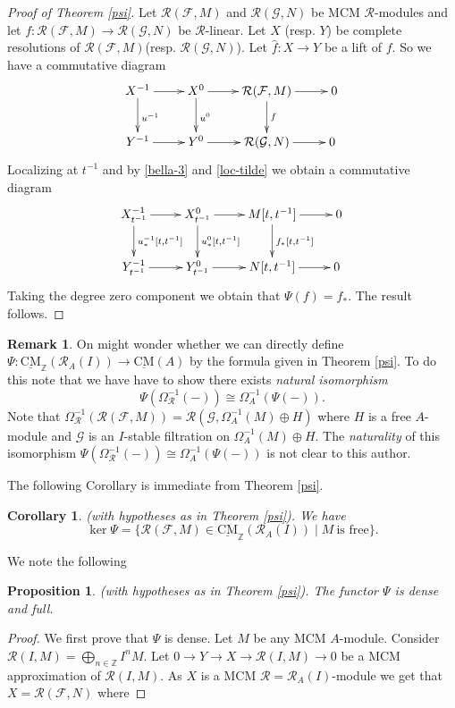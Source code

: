 \documentclass{amsart}
\newcommand{\Z}{\mathbb{Z} }
\newcommand{\eR}{\mathcal{R} }
\newcommand{\Fc}{\mathcal{F} }
\newcommand{\Gc}{\mathcal{G} }
\newcommand{\rt}{\rightarrow}
\newcommand{\Om}{\Omega}
\newcommand{\wh}{\widehat }
\newcommand{\CMS}{\operatorname{\underline{CM}}}
\theoremstyle{plain}
\newtheorem{corollary}[theorem]{Corollary}
\newtheorem{proposition}[theorem]{Proposition}
\theoremstyle{definition}
\newtheorem{remark}[theorem]{Remark}
\theoremstyle{remark}
\begin{document}
{\begin{proof}[Proof of Theorem \ref{psi}]
Let $\eR(\Fc, M)$ and $\eR(\Gc, N)$  be   MCM $\eR$-modules and let $f \colon \eR(\Fc, M) \rt \eR(\Gc, N)$ be $\eR$-linear. Let $X$ (resp. $Y$) be complete resolutions of $\eR(\Fc, M)$(resp. $\eR(\Gc, N)$). Let $\wh{f} \colon X \rt Y$ be a lift of $f$. So we have a commutative diagram
\[
  \xymatrix
{
 X^{-1}
\ar@{->}[r]
\ar@{->}[d]^{u^{-1}}
 & X^{0}
\ar@{->}[d]^{u^0}
\ar@{->}[r]
& \eR(\Fc, M)
\ar@{->}[r]
\ar@{->}[d]^{f}
& 0
\\
 Y^{-1}
 \ar@{->}[r]
 & Y^0
 \ar@{->}[r]
& \eR(\Gc, N)
\ar@{->}[r]
&0
\
 }
\]
Localizing at $t^{-1}$ and by \ref{bella-3} and  \ref{loc-tilde} we obtain a commutative diagram
\[
  \xymatrix
{
 X^{-1}_{t^{-1}}
\ar@{->}[r]
\ar@{->}[d]^{u^{-1}_*[t,t^{-1}]}
 & X^{0}_{t^{-1}}
\ar@{->}[d]^{u^0_*[t,t^{-1}]}
\ar@{->}[r]
& M[t,t^{-1}]
\ar@{->}[r]
\ar@{->}[d]^{f_*[t,t^{-1}]}
& 0
\\
 Y^{-1}_{t^{-1}}
 \ar@{->}[r]
 & Y^0_{t^{-1}}
 \ar@{->}[r]
& N[t,t^{-1}]
\ar@{->}[r]
&0
\
 }
\]
Taking the degree zero component we obtain that $\Psi(f) = f_*$. The result follows.
\end{proof}
\begin{remark}
On might wonder whether we can directly define  \\ $\Psi \colon \CMS_\Z(\eR_A(I)) \rt \CMS(A)$ by the formula given in Theorem \ref{psi}. To do this  note that we have have to show there exists \textit{natural isomorphism}
$$\Psi(\Omega^{-1}_{\eR}(-)) \cong \Omega^{-1}_A(\Psi(-)).$$  Note that
$\Om^{-1}_{\eR}(\eR(\Fc, M)) = \eR(\Gc, \Omega^{-1}_A(M) \oplus H)$ where $H$ is a free $A$-module and $\Gc$ is an $I$-stable filtration on $\Omega^{-1}_A(M) \oplus H$. The \emph{naturality} of  this isomorphism $\Psi(\Omega^{-1}_{\eR}(-)) \cong \Omega^{-1}_A(\Psi(-))$ is not clear to this author.
\end{remark}
The following Corollary is immediate from Theorem \ref{psi}.
\begin{corollary}\label{cocaine}
(with hypotheses as in Theorem  \ref{psi}). We have
$$ \ker \Psi = \{ \eR(\Fc, M) \in \CMS_\Z(\eR_A(I)) \mid M \ \text{is free}\}. $$
\end{corollary}
We note the following
\begin{proposition}\label{cocoa}
(with hypotheses as in Theorem  \ref{psi}). The functor $\Psi$ is dense and full.
\end{proposition}
\begin{proof}
We first prove that $\Psi$ is dense. Let $M$ be any MCM $A$-module. Consider $\eR(I, M) = \bigoplus_{n \in \Z} I^nM$. Let $0 \rt Y \rt X \rt \eR(I, M) \rt 0$ be a MCM approximation of $\eR(I, M)$. As $X$ is a MCM $\eR = \eR_A(I)$-module we get that $X = \eR(\Fc, N)$ where

\end{proof}}
\end{document}
